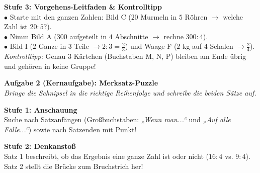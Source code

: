 \documentclass[a4paper, 10pt]{article}
\begin{document}
\begin{tcolorbox}[colback=step3Bg, colframe=step3Border, arc=1.8mm, boxrule=0.7pt, left=3mm, right=3mm, top=1.8mm, bottom=1.8mm]
    {\color{step3Text}\small\bfseries\faTasks\enskip Stufe 3: Vorgehens-Leitfaden \& Kontrolltipp}\\[1mm]
    {\footnotesize
    $\bullet$ Starte mit den ganzen Zahlen: Bild C ($20$ Murmeln in $5$ Röhren $\to$ welche Zahl ist $20 : 5$?).\\[0.5mm]
    $\bullet$ Nimm Bild A ($300$ aufgeteilt in $4$ Abschnitte $\to$ rechne $300 : 4$).\\[0.5mm]
    $\bullet$ Bild I ($2$ Ganze in $3$ Teile $\to 2 : 3 = \frac{2}{3}$) und Waage F ($2$ kg auf $4$ Schalen $\to \frac{2}{4}$).\\[0.5mm]
    \textit{Kontrolltipp:} Genau 3 Kärtchen (Buchstaben M, N, P) bleiben am Ende übrig und gehören in keine Gruppe!
    }
\end{tcolorbox}

\vspace{3.5mm}

\begin{tcolorbox}[enhanced, colback=lvlBlue!5, colframe=lvlBlue!60, arc=2mm, boxrule=0.8pt, left=3mm, right=3mm, top=2mm, bottom=2mm]
    {\bfseries\color{lvlBlue} \faPuzzlePiece\enskip Aufgabe 2 (Kernaufgabe): Merksatz-Puzzle}\\[1mm]
    {\footnotesize\textit{Bringe die Schnipsel in die richtige Reihenfolge und schreibe die beiden Sätze auf.}}
\end{tcolorbox}

\vspace{1.2mm}

\begin{tcolorbox}[colback=step1Bg, colframe=step1Border, arc=1.8mm, boxrule=0.7pt, left=3mm, right=3mm, top=1.8mm, bottom=1.8mm]
    {\color{step1Text}\small\bfseries\faEye\enskip Stufe 1: Anschauung}\\[1mm]
    {\footnotesize Suche nach Satzanfängen (Großbuchstaben: \textit{„Wenn man...“} und \textit{„Auf alle Fälle...“}) sowie nach Satzenden mit Punkt!}
\end{tcolorbox}

\begin{tcolorbox}[colback=step2Bg, colframe=step2Border, arc=1.8mm, boxrule=0.7pt, left=3mm, right=3mm, top=1.8mm, bottom=1.8mm]
    {\color{step2Text}\small\bfseries\faLightbulb\enskip Stufe 2: Denkanstoß}\\[1mm]
    {\footnotesize Satz 1 beschreibt, ob das Ergebnis eine ganze Zahl ist oder nicht ($16:4$ vs. $9:4$). Satz 2 stellt die Brücke zum Bruchstrich her!}
\end{tcolorbox}
\end{document}
